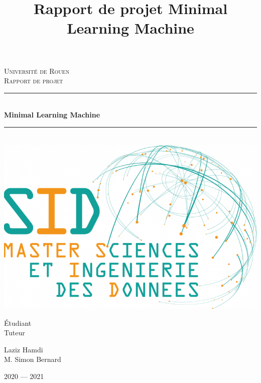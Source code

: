 \documentclass[12pt,a4paper]{report}
\title{Rapport de projet Minimal Learning Machine}
\newcommand{\HRule}{\rule{\linewidth}{0.5mm}}
\begin{document}
\begin{titlepage}
  \begin{sffamily}
  \begin{center}

    \textsc{\LARGE Université de Rouen}\\[2cm]

    \textsc{\Large Rapport de projet}\\[1.5cm]

    \HRule \\[0.4cm]
    { \huge \bfseries Minimal Learning Machine \\[0.4cm] }

    \HRule \\[2cm]
    \includegraphics[scale=0.2]{SID.png}
    \\[2cm]

    \begin{minipage}{0.4\textwidth}
      \begin{flushleft} \large
       Étudiant\\Tuteur
      \end{flushleft}
    \end{minipage}
    \begin{minipage}{0.4\textwidth}
      \begin{flushright} \large
      Laziz Hamdi\\M. Simon Bernard
      \end{flushright}
    \end{minipage}

    \vfill

    {\large 2020 — 2021}

  \end{center}
  \end{sffamily}
\end{titlepage}
\tableofcontents
\end{document}
